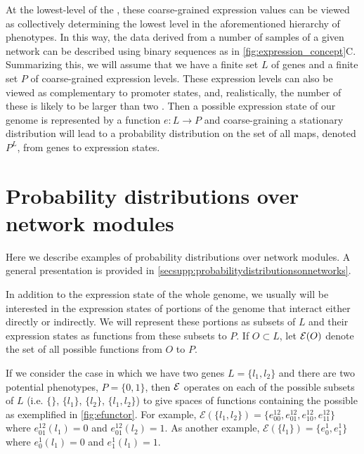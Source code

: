 At the lowest-level of the \gnpm{}, these coarse-grained expression values can be viewed as collectively determining the lowest level in the aforementioned hierarchy of phenotypes. In this way, the data derived from a number of samples of a given network can be described using binary sequences as in \ref{fig:expression_concept}C.  Summarizing this, we will assume that we have a finite set $L$ of genes and a finite set $P$ of coarse-grained expression levels. These expression levels can also be viewed as complementary to promoter states, and, realistically, the number of these is likely to be larger than two \cite{Rieckh2013a}.  Then a possible expression state of our genome is represented by a function $e : L \to P$ and coarse-graining a stationary distribution will lead to a probability distribution on the set of all maps, denoted $P^L$, from genes to expression states.

\section{Probability distributions over network modules}\label{sec:probabilitydistributionsonnetworks}
Here we describe examples of probability distributions over network modules. A general presentation is provided in  \ref{secsupp:probabilitydistributionsonnetworks}.

In addition to the expression state of the whole genome, we usually will be interested in the expression states of portions of the genome that interact either directly or indirectly.  We will represent these portions as subsets of $L$ and their expression states as functions from these subsets to $P$. If $O \subset L$, let $\mathcal{E}{}(O)$ denote the set of all possible functions from $O$ to $P$.

If we consider the case in which we have two genes $L=\{l_1,l_2\}$ and there are two potential phenotypes, $P=\{0,1\}$, then $\mathcal{E}$ operates on each of the possible subsets of $L$ (i.e. $\{\}$, $\{l_1\}$, $\{l_2\}$, $\{l_1,l_2\}$) to give spaces of functions containing the possible \gnpm{} as exemplified in \ref{fig:efunctor}. For example, $\mathcal{E}(\{l_1,l_2\}) = \{ e^{12}_{00},e^{12}_{01},e^{12}_{10},e^{12}_{11} \}$ where $e^{12}_{01}(l_1) = 0$ and $e^{12}_{01}(l_2) = 1$. As another example, $\mathcal{E}(\{l_1\}) = \{ e^{1}_{0},e^{1}_{1} \}$ where $e^{1}_{0}(l_1)=0$ and $e^{1}_{1}(l_1)=1$.

